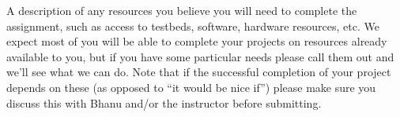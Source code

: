 A description of any resources you believe you will need to complete the assignment, such as access to testbeds, software, hardware resources, etc. We expect most of you will be able to complete your projects on resources already available to you, but if you have some particular needs please call them out and we'll see what we can do. Note that if the successful completion of your project depends on these (as opposed to ``it would be nice if'') please make sure you discuss this with Bhanu and/or the instructor before submitting.
